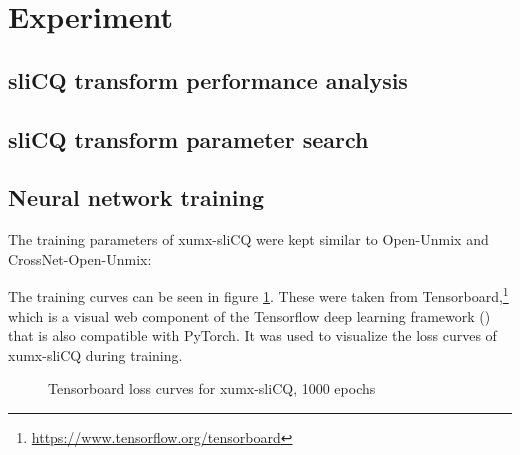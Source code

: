 \documentclass[report.tex]{subfiles}
\begin{document}
\section{Experiment}

\subsection{sliCQ transform performance analysis}

\subsection{sliCQ transform parameter search}

\subsection{Neural network training}

The training parameters of xumx-sliCQ were kept similar to Open-Unmix and CrossNet-Open-Unmix:


The training curves can be seen in figure \ref{fig:networkloss}. These were taken from Tensorboard,\footnote{\url{https://www.tensorflow.org/tensorboard}} which is a visual web component of the Tensorflow deep learning framework (\cite{tensorflow, tensorflowsoft}) that is also compatible with PyTorch. It was used to visualize the loss curves of xumx-sliCQ during training.

\begin{figure}[ht]
	\centering
	\hspace{0.5em}
	\caption{Tensorboard loss curves for xumx-sliCQ, 1000 epochs}
	\label{fig:networkloss}
\end{figure}
\end{document}
